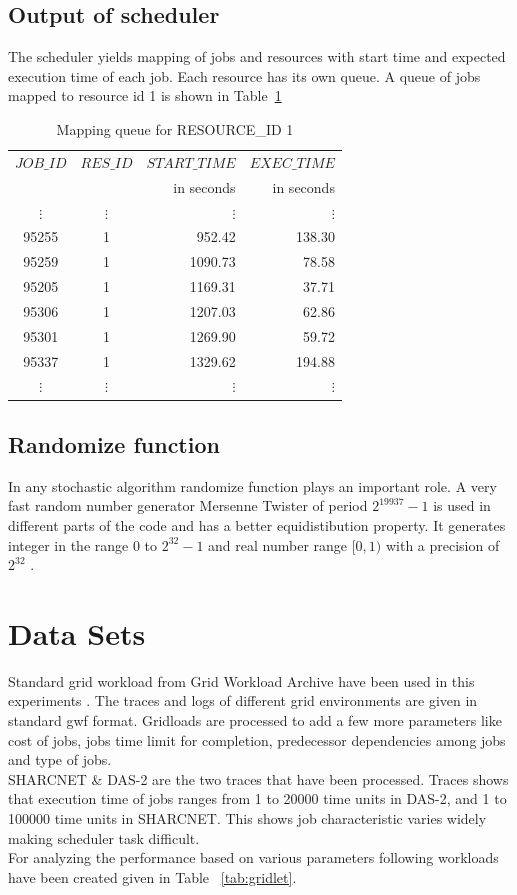 \subsection{Output of scheduler}
The scheduler yields mapping of jobs and resources with start time and expected execution time of each job. Each resource has its own queue. A queue of jobs mapped to resource id 1 is shown in Table~\ref{tab:out}
\begin{table}[ht]
\caption{Mapping queue for RESOURCE\_ID 1}
 \centering
    \begin{tabular}{|c|c|r|r|}
    \hline \hline
    $JOB\_ID$ & $RES\_ID$ & $START\_TIME$ & $EXEC\_TIME$ \\ 
     &  & in seconds & in seconds \\ \hline \hline
    $\vdots$ & $\vdots$ & $\vdots$   & $\vdots$ \\ 
    95255	& 1	& 952.42	& 138.30 \\ 	
    95259	& 1	& 1090.73	& 78.58 \\ 
    95205	& 1	& 1169.31	& 37.71 \\ 
    95306	& 1	& 1207.03	& 62.86 \\ 
    95301	& 1	& 1269.90	& 59.72 \\ 
    95337	& 1	& 1329.62	& 194.88 \\
    $\vdots$ & $\vdots$ & $\vdots$   & $\vdots$ \\ \hline \hline
    \end{tabular}
\label{tab:out}
\end{table}

\subsection{Randomize function}
In any stochastic algorithm randomize function plays an important role. A very fast random number generator Mersenne Twister of period $2^{19937}-1$ is used in different parts of the code and has a better equidistibution property. It generates integer in the range $0$ to $2^{32}-1$ and real number range $[0,1)$ with a precision of $2^{32}$ \cite{saito2007application}.

\section{Data Sets}
\label{datasets}
Standard grid workload from Grid Workload Archive have been used in this experiments \cite{gridload}. The traces and logs of different grid environments are given in standard gwf format. Gridloads are processed to add a few more parameters like cost of jobs, jobs time limit for completion, predecessor dependencies among jobs and type of jobs. \\
SHARCNET \& DAS-2 are the two traces that have been processed. Traces shows that execution time of jobs ranges from 1 to 20000 time units in DAS-2, and 1 to 100000 time units in SHARCNET. This shows job characteristic varies widely making scheduler task difficult.\\
For analyzing the performance based on various parameters following workloads have been created given in Table ~\ref{tab:gridlet}.

